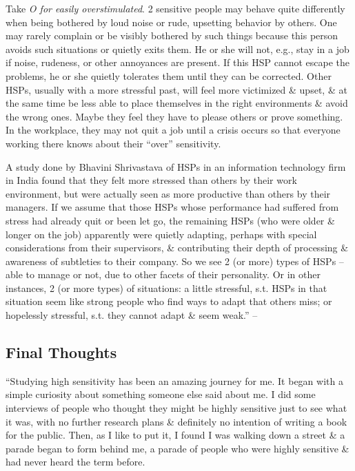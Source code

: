\documentclass{article}
\numberwithin{equation}{section}
\begin{document}
Take \textit{O for easily overstimulated}. 2 sensitive people may behave quite differently when being bothered by loud noise or rude, upsetting behavior by others. One may rarely complain or be visibly bothered by such things because this person avoids such situations or quietly exits them. He or she will not, e.g., stay in a job if noise, rudeness, or other annoyances are present. If this HSP cannot escape the problems, he or she quietly tolerates them until they can be corrected. Other HSPs, usually with a more stressful past, will feel more victimized \& upset, \& at the same time be less able to place themselves in the right environments \& avoid the wrong ones. Maybe they feel they have to please others or prove something. In the workplace, they may not quit a job until a crisis occurs so that everyone working there knows about their ``over'' sensitivity.

A study done by Bhavini Shrivastava of HSPs in an information technology firm in India found that they felt more stressed than others by their work environment, but were actually seen as more productive than others by their managers. If we assume that those HSPs whose performance had suffered from stress had already quit or been let go, the remaining HSPs (who were older \& longer on the job) apparently were quietly adapting, perhaps with special considerations from their supervisors, \& contributing their depth of processing \& awareness of subtleties to their company. So we see 2 (or more) types of HSPs -- able to manage or not, due to other facets of their personality. Or in other instances, 2 (or more types) of situations: a little stressful, s.t. HSPs in that situation seem like strong people who find ways to adapt that others miss; or hopelessly stressful, s.t. they cannot adapt \& seem weak.'' -- \cite[pp. 24--25]{Aron2013}

\subsection*{Final Thoughts}
``Studying high sensitivity has been an amazing journey for me. It began with a simple curiosity about something someone else said about me. I did some interviews of people who thought they might be highly sensitive just to see what it was, with no further research plans \& definitely no intention of writing a book for the public. Then, as I like to put it, I found I was walking down a street \& a parade began to form behind me, a parade of people who were highly sensitive \& had never heard the term before.
\end{document}
